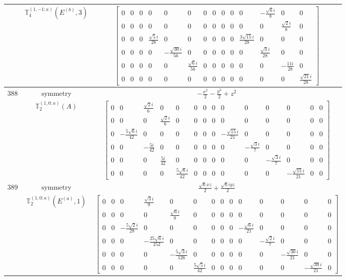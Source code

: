 \documentclass[fleqn,8pt,landscape]{jsarticle}
\begin{document}
\begin{longtable}{ccc}
$  $ & $ \mathbb{T}_{4}^{(1,-1;a)}(E^{(b)},3) $ & $ \begin{bmatrix} 0 & 0 & 0 & 0 & 0 & 0 & 0 & 0 & 0 & 0 & 0 & - \frac{\sqrt{6} i}{8} & 0 & 0 \\ 0 & 0 & 0 & 0 & 0 & 0 & 0 & 0 & 0 & 0 & 0 & 0 & \frac{\sqrt{2} i}{8} & 0 \\ 0 & 0 & 0 & \frac{\sqrt{5} i}{28} & 0 & 0 & 0 & 0 & 0 & 0 & \frac{3 \sqrt{15} i}{28} & 0 & 0 & 0 \\ 0 & 0 & 0 & 0 & - \frac{\sqrt{30} i}{56} & 0 & 0 & 0 & 0 & 0 & 0 & \frac{\sqrt{3} i}{28} & 0 & 0 \\ 0 & 0 & 0 & 0 & 0 & \frac{\sqrt{6} i}{56} & 0 & 0 & 0 & 0 & 0 & 0 & - \frac{11 i}{28} & 0 \\ 0 & 0 & 0 & 0 & 0 & 0 & 0 & 0 & 0 & 0 & 0 & 0 & 0 & \frac{\sqrt{21} i}{28} \end{bmatrix} $ \\ \hline
$ 388 $ & $ \text{symmetry} $ & $ - \frac{x^{2}}{2} - \frac{y^{2}}{2} + z^{2} $ \\
$  $ & $ \mathbb{T}_{2}^{(1,0;a)}(A) $ & $ \begin{bmatrix} 0 & 0 & \frac{\sqrt{2} i}{6} & 0 & 0 & 0 & 0 & 0 & 0 & 0 & 0 & 0 & 0 & 0 \\ 0 & 0 & 0 & \frac{\sqrt{2} i}{6} & 0 & 0 & 0 & 0 & 0 & 0 & 0 & 0 & 0 & 0 \\ 0 & - \frac{5 \sqrt{6} i}{42} & 0 & 0 & 0 & 0 & 0 & 0 & - \frac{\sqrt{15} i}{21} & 0 & 0 & 0 & 0 & 0 \\ 0 & 0 & - \frac{5 i}{42} & 0 & 0 & 0 & 0 & 0 & 0 & - \frac{\sqrt{3} i}{7} & 0 & 0 & 0 & 0 \\ 0 & 0 & 0 & \frac{5 i}{42} & 0 & 0 & 0 & 0 & 0 & 0 & - \frac{\sqrt{3} i}{7} & 0 & 0 & 0 \\ 0 & 0 & 0 & 0 & \frac{5 \sqrt{6} i}{42} & 0 & 0 & 0 & 0 & 0 & 0 & - \frac{\sqrt{15} i}{21} & 0 & 0 \end{bmatrix} $ \\ \hline
$ 389 $ & $ \text{symmetry} $ & $ \frac{\sqrt{6} x z}{2} + \frac{\sqrt{6} i y z}{2} $ \\
$  $ & $ \mathbb{T}_{2}^{(1,0;a)}(E^{(a)},1) $ & $ \begin{bmatrix} 0 & 0 & 0 & \frac{\sqrt{3} i}{9} & 0 & 0 & 0 & 0 & 0 & 0 & 0 & 0 & 0 & 0 \\ 0 & 0 & 0 & 0 & \frac{\sqrt{6} i}{9} & 0 & 0 & 0 & 0 & 0 & 0 & 0 & 0 & 0 \\ 0 & 0 & - \frac{5 \sqrt{2} i}{28} & 0 & 0 & 0 & 0 & 0 & 0 & - \frac{\sqrt{6} i}{21} & 0 & 0 & 0 & 0 \\ 0 & 0 & 0 & - \frac{25 \sqrt{6} i}{252} & 0 & 0 & 0 & 0 & 0 & 0 & - \frac{\sqrt{2} i}{7} & 0 & 0 & 0 \\ 0 & 0 & 0 & 0 & - \frac{5 \sqrt{3} i}{126} & 0 & 0 & 0 & 0 & 0 & 0 & - \frac{\sqrt{30} i}{21} & 0 & 0 \\ 0 & 0 & 0 & 0 & 0 & \frac{5 \sqrt{5} i}{42} & 0 & 0 & 0 & 0 & 0 & 0 & - \frac{\sqrt{30} i}{21} & 0 \end{bmatrix} $ \\ \hline

\end{longtable}
\end{document}
